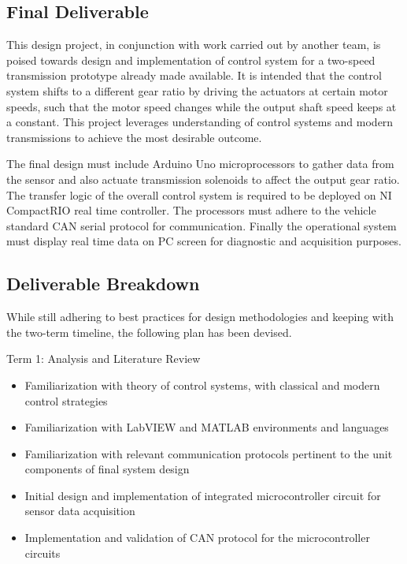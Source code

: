 \documentclass{article}
\begin{document}
\subsection{Final Deliverable}
\begin{flushleft}
This design project, in conjunction with work carried out by another team, is poised towards design and implementation of control system for a two-speed transmission prototype already made available. It is intended that the control system shifts to a different gear ratio by driving the actuators at certain motor speeds, such that the motor speed changes while the output shaft speed keeps at a constant. This project leverages understanding of control systems and modern transmissions to achieve the most desirable outcome.\end{flushleft}

\begin{flushleft}
The final design must include Arduino Uno microprocessors to gather data from the sensor and also actuate transmission solenoids to affect the output gear ratio. The transfer logic of the overall control system is required to be deployed on NI CompactRIO real time controller. The processors must adhere to the vehicle standard CAN serial protocol for communication. Finally the operational system must display real time data on PC screen for diagnostic and acquisition purposes.\end{flushleft}

\subsection{Deliverable Breakdown}
\begin{flushleft}
While still adhering to best practices for design methodologies and keeping with the two-term timeline, the following plan has been devised.
\end{flushleft}

\begin{flushleft}
Term 1: Analysis and Literature Review
\begin{itemize}
  \item Familiarization with theory of control systems, with classical and modern control strategies
  \item Familiarization with LabVIEW and MATLAB environments and languages
  \item Familiarization with relevant communication protocols pertinent to the unit components of final system design 
  \item Initial design and implementation of integrated microcontroller circuit for sensor data acquisition
  \item Implementation and validation of CAN protocol for the microcontroller circuits
\end{itemize}
\end{flushleft}
\end{document}
